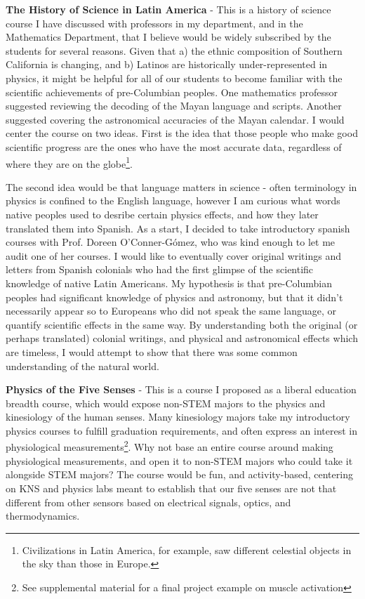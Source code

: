 \documentclass[../../main.tex]{subfiles}
\begin{document}
\textbf{The History of Science in Latin America} - This is a history of science course I have discussed with professors in my department, and in the Mathematics Department, that I believe would be widely subscribed by the students for several reasons.  Given that a) the ethnic composition of Southern California is changing, and b) Latinos are historically under-represented in physics, it might be helpful for all of our students to become familiar with the scientific achievements of pre-Columbian peoples.  One mathematics professor suggested reviewing the decoding of the Mayan language and scripts.  Another suggested covering the astronomical accuracies of the Mayan calendar.  I would center the course on two ideas. First is the idea that those people who make good scientific progress are the ones who have the most accurate data, regardless of where they are on the globe\footnote{Civilizations in Latin America, for example, saw different celestial objects in the sky than those in Europe.}. \\ \hspace{0.1cm}

The second idea would be that language matters in science - often terminology in physics is confined to the English language, however I am curious what words native peoples used to desribe certain physics effects, and how they later translated them into Spanish.  As a start, I decided to take introductory spanish courses with Prof. Doreen O'Conner-G\'{o}mez, who was kind enough to let me audit one of her courses.  I would like to eventually cover original writings and letters from Spanish colonials who had the first glimpse of the scientific knowledge of native Latin Americans.  My hypothesis is that pre-Columbian peoples had significant knowledge of physics and astronomy, but that it didn't necessarily appear so to Europeans who did not speak the same language, or quantify scientific effects in the same way.  By understanding both the original (or perhaps translated) colonial writings, and physical and astronomical effects which are timeless, I would attempt to show that there was some common understanding of the natural world. \\ \hspace{0.1cm}

\textbf{Physics of the Five Senses} - This is a course I proposed as a liberal education breadth course, which would expose non-STEM majors to the physics and kinesiology of the human senses.  Many kinesiology majors take my introductory physics courses to fulfill graduation requirements, and often express an interest in physiological measurements\footnote{See supplemental material for a final project example on muscle activation}.  Why not base an entire course around making physiological measurements, and open it to non-STEM majors who could take it alongside STEM majors?  The course would be fun, and activity-based, centering on KNS and physics labs meant to establish that our five senses are not that different from other sensors based on electrical signals, optics, and thermodynamics.
\end{document}
